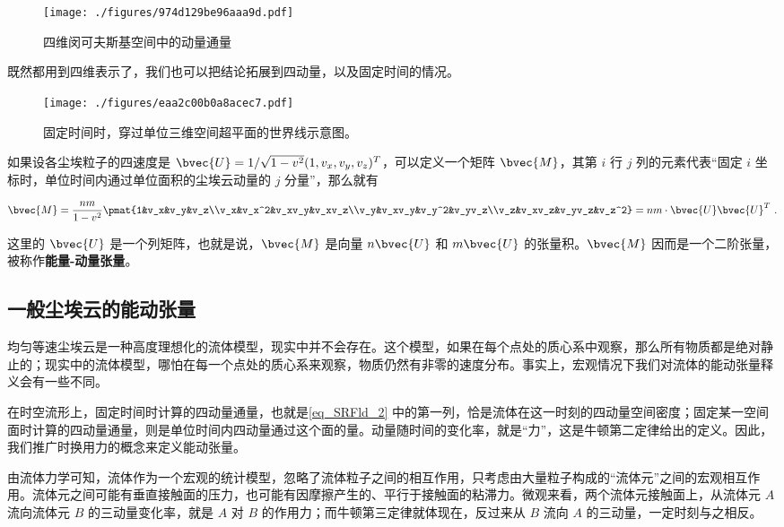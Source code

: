\begin{figure}[ht]
\centering
\texttt{[image: ./figures/974d129be96aaa9d.pdf]}
\caption{四维闵可夫斯基空间中的动量通量} \label{fig_SRFld_2}
\end{figure}

既然都用到四维表示了，我们也可以把结论拓展到四动量，以及固定时间的情况。

\begin{figure}[ht]
\centering
\texttt{[image: ./figures/eaa2c00b0a8acec7.pdf]}
\caption{固定时间时，穿过单位三维空间超平面的世界线示意图。} \label{fig_SRFld_3}
\end{figure}

如果设各尘埃粒子的四速度是 $\bvec{U}=1/\sqrt{1-v^2}(1, v_x, v_y, v_z)^T$，可以定义一个矩阵 $\bvec{M}$，其第 $i$ 行 $j$ 列的元素代表“固定 $i$ 坐标时，单位时间内通过单位面积的尘埃云动量的 $j$ 分量”，那么就有

\begin{equation}\label{eq_SRFld_2}
\bvec{M}=\frac{nm}{1-v^2}\pmat{1&v_x&v_y&v_z\\v_x&v_x^2&v_xv_y&v_xv_z\\v_y&v_xv_y&v_y^2&v_yv_z\\v_z&v_xv_z&v_yv_z&v_z^2}=nm\cdot\bvec{U}\bvec{U}^T~.
\end{equation}

这里的 $\bvec{U}$ 是一个列矩阵，也就是说，$\bvec{M}$ 是向量 $n\bvec{U}$ 和 $m\bvec{U}$ 的张量积。$\bvec{M}$ 因而是一个二阶张量，被称作\textbf{能量-动量张量}。


\subsection{一般尘埃云的能动张量}

均匀等速尘埃云是一种高度理想化的流体模型，现实中并不会存在。这个模型，如果在每个点处的质心系中观察，那么所有物质都是绝对静止的；现实中的流体模型，哪怕在每一个点处的质心系来观察，物质仍然有非零的速度分布。事实上，宏观情况下我们对流体的能动张量释义会有一些不同。

在时空流形上，固定时间时计算的四动量通量，也就是\autoref{eq_SRFld_2} 中的第一列，恰是流体在这一时刻的四动量空间密度；固定某一空间面时计算的四动量通量，则是单位时间内四动量通过这个面的量。动量随时间的变化率，就是“力”，这是牛顿第二定律给出的定义。因此，我们推广时换用力的概念来定义能动张量。

由流体力学可知，流体作为一个宏观的统计模型，忽略了流体粒子之间的相互作用，只考虑由大量粒子构成的“流体元”之间的宏观相互作用。流体元之间可能有垂直接触面的压力，也可能有因摩擦产生的、平行于接触面的粘滞力。微观来看，两个流体元接触面上，从流体元 $A$ 流向流体元 $B$ 的三动量变化率，就是 $A$ 对 $B$ 的作用力；而牛顿第三定律就体现在，反过来从 $B$ 流向 $A$ 的三动量，一定时刻与之相反。


